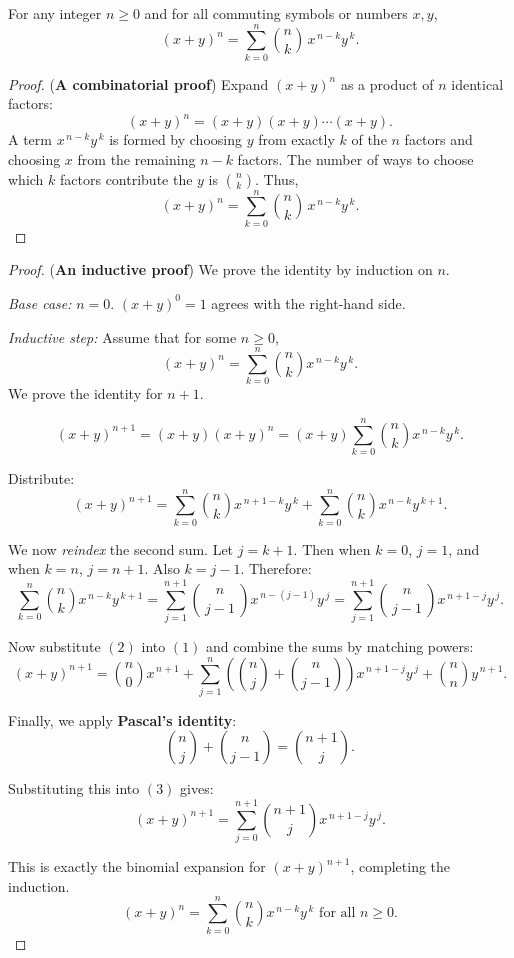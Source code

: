 \begin{theorem}
For any integer $n \ge 0$ and for all commuting symbols or numbers $x,y$,
\[
(x+y)^n = \sum_{k=0}^{n} \binom{n}{k}\, x^{\,n-k} y^{\,k}.
\]
\end{theorem}

\begin{proof} ({\bf A combinatorial proof})
Expand $(x+y)^n$ as a product of $n$ identical factors:
\[
(x+y)^n = (x+y)(x+y)\cdots(x+y).
\]
A term $x^{\,n-k}y^{\,k}$ is formed by choosing $y$ from exactly $k$ of the $n$
factors and choosing $x$ from the remaining $n-k$ factors. The number of ways to
choose which $k$ factors contribute the $y$ is $\binom{n}{k}$. Thus,
\[
(x+y)^n = \sum_{k=0}^{n} \binom{n}{k}\, x^{\,n-k} y^{\,k}.
\]
\end{proof}

\begin{proof} ({\bf An inductive proof})
We prove the identity by induction on $n$.

\emph{Base case:} $n=0$. $(x+y)^0 = 1$ agrees with the right-hand side.

\emph{Inductive step:} 
Assume that for some $n \ge 0$,
\[
(x+y)^n = \sum_{k=0}^{n} \binom{n}{k} x^{\,n-k} y^{\,k}. \tag{$\ast$}
\]
We prove the identity for $n+1$.

\[
(x+y)^{n+1}
= (x+y)(x+y)^n
= (x+y)\sum_{k=0}^{n} \binom{n}{k} x^{\,n-k} y^{\,k}.
\]

Distribute:
\[
(x+y)^{n+1}
= \sum_{k=0}^{n} \binom{n}{k} x^{\,n+1-k} y^{\,k}
  + \sum_{k=0}^{n} \binom{n}{k} x^{\,n-k} y^{\,k+1}. \tag{1}
\]

We now \emph{reindex} the second sum. Let $j = k+1$. Then when $k=0$, $j=1$,
and when $k=n$, $j=n+1$. Also $k = j-1$. Therefore:
\[
\sum_{k=0}^{n} \binom{n}{k} x^{\,n-k} y^{\,k+1}
= \sum_{j=1}^{n+1} \binom{n}{\,j-1\,} x^{\,n-(j-1)} y^{\,j}
= \sum_{j=1}^{n+1} \binom{n}{\,j-1\,} x^{\,n+1-j} y^{\,j}. \tag{2}
\]

Now substitute $(2)$ into $(1)$ and combine the sums by matching powers:
\[
(x+y)^{n+1}
= \binom{n}{0} x^{\,n+1}
  + \sum_{j=1}^{n} \left(\binom{n}{j} + \binom{n}{j-1}\right) x^{\,n+1-j} y^{\,j}
  + \binom{n}{n} y^{\,n+1}. \tag{3}
\]

\medskip
Finally, we apply \textbf{Pascal's identity}:
\[
\binom{n}{j} + \binom{n}{j-1} = \binom{n+1}{j}.
\]

Substituting this into $(3)$ gives:
\[
(x+y)^{n+1}
= \sum_{j=0}^{n+1} \binom{n+1}{j} x^{\,n+1-j} y^{\,j}.
\]

This is exactly the binomial expansion for $(x+y)^{n+1}$, completing the induction.
\[
\boxed{(x+y)^n = \sum_{k=0}^{n} \binom{n}{k} x^{\,n-k} y^{\,k} \text{ for all } n \ge 0.}
\]
\end{proof}

